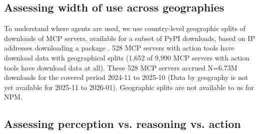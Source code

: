 \documentclass[manuscript,screen,nonacm,oneside]{acmart}
\begin{document}
\subsection{Assessing width of use across geographies}
\label{sec:geo-tools}

To understand where agents are used, we use country-level geographic splits of downloads of MCP servers, available for a subset of PyPI downloads, based on IP addresses downloading a package \citep{githubGitHubPypilinehaulcloudfunction}. 528 MCP servers with action tools have download data with geographical splits (1,652 of 9,990 MCP servers with action tools have download data at all). These 528 MCP servers accrued N=6.73M downloads for the covered period 2024-11 to 2025-10 (Data by geography is not yet available for 2025-11 to 2026-01). Geographic splits are not available to us for NPM.
\subsection{Assessing perception vs. reasoning vs. action}
\label{sec:direct-impact}
\end{document}
